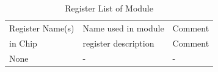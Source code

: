 \begin{table}[H]
\caption{Register List of Module \asimem}
\label{tab:asImemPer03}
\centering
\begin{tabularx}{\textwidth}{|l |l |X|}
  \hline
  Register Name(s) & Name used in module & Comment \\
  in Chip & register description & Comment \\
  \hline
  \hline
  None & - & - \\
  \hline
\end{tabularx}
\end{table}
